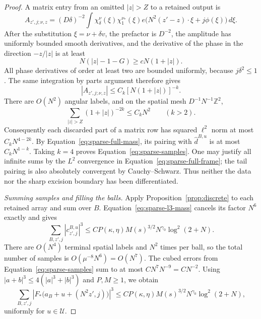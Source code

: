 \begin{proof}
A matrix entry from an omitted $|z|>Z$ to a retained output is
\[
 A_{z',j;\nu,z}
  =(D\delta)^{-2}\int\chi_\delta^\nu(\xi)\chi_1^{\nu_*}(\xi)
          e\big(N^2(z'-z)\cdot\xi+j\phi(\xi)\big)\,d\xi.
\]
After the substitution $\xi=\nu+\delta v$, the prefactor is
$D^{-2}$, the amplitude has uniformly bounded smooth derivatives,
and the derivative of the phase in the direction $-z/|z|$ is at least
\[
 N(|z|-1-G)\geq cN(1+|z|).
\]
All phase derivatives of order at least two are bounded uniformly,
because $j\delta^2\leq1$.  The same integration by parts argument
therefore gives
\begin{equation}\label{eq:sparse-tail-entry}
 |A_{z',j;\nu,z}|\leq C_k[N(1+|z|)]^{-k}.
\end{equation}
There are $O(N^2)$ angular labels, and on the spatial mesh
$D^{-1}N^{-1}\mathbb Z^2$,
\[
 \sum_{|z|>Z}(1+|z|)^{-2k}\leq C_kN^2\qquad(k>2).
\]
Consequently each discarded part of a matrix row has squared
$\ell^2$ norm at most $C_kN^{4-2k}$.  By
Equation~\eqref{eq:sparse-full-mass}, its pairing with
$\widehat d^{B,u}$ is at most $C_kN^{1-k}$.  Taking $k=4$ proves
Equation~\eqref{eq:sparse-samples}.  One may justify all infinite
sums by the $L^2$ convergence in
Equation~\eqref{eq:sparse-full-frame}; the tail pairing is also
absolutely convergent by Cauchy--Schwarz.  Thus neither the data nor
the sharp excision boundary has been differentiated.

\emph{Summing samples and filling the balls.}
Apply Proposition~\ref{prop:discrete} to each retained array and sum
over $B$.  Equation~\eqref{eq:sparse-l3-mass} cancels its factor
$N^6$ exactly and gives
\[
 \sum_{B,z',j}|c^{B,u}_{z',j}|^3
 \leq C P(\kappa,\eta)M(s)^{3/2}
                         N^{\gamma_0}\log^2(2+N).
\]
There are $O(N^4)$ terminal spatial labels and $N^2$ times per ball,
so the total number of samples is $O(\mu^{-8}N^6)=O(N^7)$.
The cubed errors from Equation~\eqref{eq:sparse-samples} sum to at
most $CN^7N^{-9}=CN^{-2}$.  Using
$|a+b|^3\leq4(|a|^3+|b|^3)$ and $P,M\geq1$, we obtain
\begin{equation}\label{eq:sparse-cube-sum}
 \sum_{B,z',j}
  |F_*\big(a_B+u+(N^2z',j)\big)|^3
 \leq C P(\kappa,\eta)M(s)^{3/2}
                         N^{\gamma_0}\log^2(2+N),
\end{equation}
uniformly for $u\in\mathcal U$.


\end{proof}
